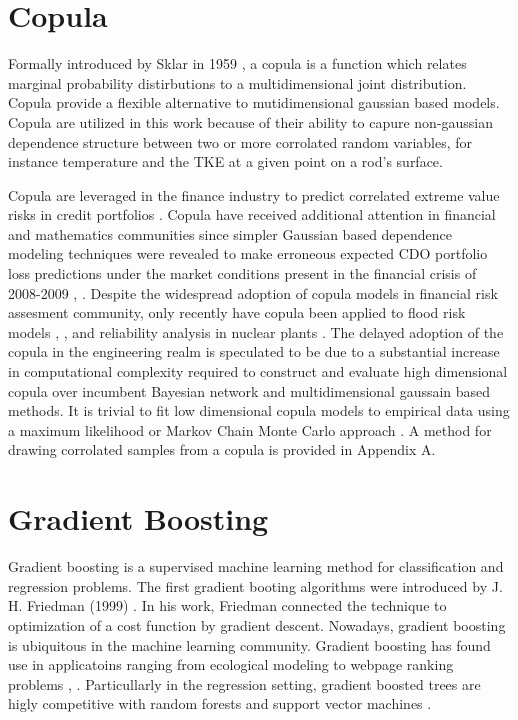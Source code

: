 \section{Copula}

Formally introduced by Sklar in 1959 \cite{Sklar1959}, a copula is a function which relates marginal probability distirbutions to a multidimensional joint distribution.  Copula provide a flexible alternative to mutidimensional gaussian based models.  Copula are utilized in this work because of their ability to capure non-gaussian dependence structure between two or more corrolated random variables, for instance temperature and the TKE at a given point on a rod's surface.  

Copula are leveraged in the finance industry to
predict correlated extreme value risks in credit portfolios
\cite{Geidosch2016}.  Copula have received additional attention in financial and mathematics communities since 
simpler Gaussian based dependence modeling techniques were revealed to make erroneous expected CDO portfolio loss predictions under the market conditions present in the financial crisis of
2008-2009 \cite{MacKenzie2013}, \cite{Li2000}.  Despite the widespread adoption of copula models in financial risk assesment community, only recently have copula been applied to flood risk
models \cite{Dupuis2007}, \cite{Ganguli2012}, and reliability analysis in nuclear plants
\cite{Kelly2007}.  The delayed adoption of the copula in the
engineering realm is speculated to be due to a substantial increase in computational
complexity required to construct and evaluate high dimensional copula over
incumbent Bayesian network and multidimensional gaussain based methods.  
It is trivial to fit low dimensional copula models to empirical data
using a maximum likelihood or Markov Chain Monte Carlo approach \cite{Jouini1996}.
A method for drawing corrolated samples from a copula is provided in Appendix A.

\section{Gradient Boosting}

Gradient boosting is a supervised machine learning method for classification and regression problems.
The first gradient booting algorithms were introduced by J. H. Friedman (1999) \cite{friedman2001}.  In his work, Friedman connected the technique to optimization of a cost function by gradient descent.
Nowadays, gradient boosting is ubiquitous in the machine learning community.  Gradient boosting has found use in applicatoins ranging from ecological modeling \cite{death2007} to webpage ranking problems \cite{Tyree2011}, \cite{chapelle2011}.  Particullarly in the regression setting, gradient boosted trees are higly competitive with random forests and support vector machines \cite{moisen2006}. 


